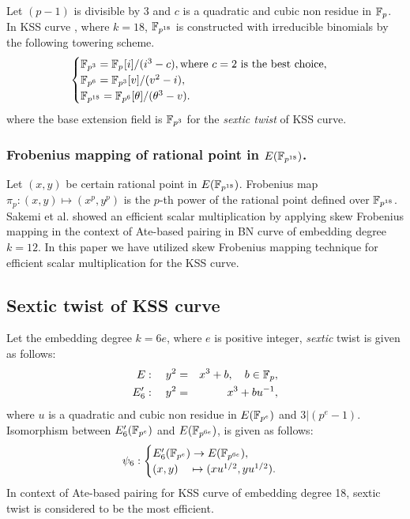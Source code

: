 Let $(p-1)$ is divisible by 3 and $c$ is a quadratic and cubic non residue in ${\mathbb{F}}_{p}$. In KSS curve \cite{kss}, where $k=18$, $\mathbb{F}_{p^{18}}$ is constructed  with irreducible binomials by the following towering scheme.
\begin{equation}
\begin{cases}
{\mathbb{F}}_{p^{3}} = {\mathbb{F}}_{p^{}}[i]/(i^3-c),  \text{where $c = 2$ is the best choice,}\nonumber \\ 
{\mathbb{F}}_{p^{6}} = {\mathbb{F}}_{p^{3}}[v]/(v^2-i), \nonumber \\ 
{\mathbb{F}}_{p^{18}} = {\mathbb{F}}_{p^{6}}[\theta]/(\theta^3-v). \nonumber \\ 
\end{cases}
\end{equation}\label{KSS_towering}
where the base extension field is $\mathbb{F}_{p^3}$ for the \textit{sextic twist} of KSS curve.

\subsubsection{Frobenius mapping of rational point in  $E(\mathbb{F}_{p^{18}})$.}
Let $(x,y)$ be certain rational point in $E(\mathbb{F}_{p^{18}})$. 
Frobenius map $\pi_p : (x,y) \mapsto  (x^p,y^p)$ is the $p$-th power of the rational point defined over $\mathbb{F}_{p^{18}}$. 
Sakemi et al. \cite{sakemi_skew} showed an efficient scalar multiplication by applying skew Frobenius mapping in the context of Ate-based pairing in BN curve of embedding degree $k=12$.  In this paper we have utilized skew Frobenius mapping technique for efficient scalar multiplication for the KSS curve.

\subsection{Sextic twist of KSS curve}
Let the embedding degree $k = 6e$, where $e$ is positive integer, \textit{sextic} twist is given as follows:
\begin{eqnarray}
E:  \quad y^2 & = & x^3+b, \quad b \in {\mathbb{F}}_{p}, \\
E'_6: \quad y^2 & =  & x^3+bu^{-1},
\end{eqnarray}  
where $u$ is a quadratic and cubic non residue in $E({\mathbb{F}}_{p^{e}})$ and $3|(p^e-1)$.  Isomorphism between $E'_6({\mathbb{F}}_{p^{e}})$ and $E({\mathbb{F}}_{p^{6e}})$, is given as follows:
\begin{eqnarray}
\psi_6 : \begin{cases}
E'_6({\mathbb{F}}_{p^{e}}) \rightarrow E({\mathbb{F}}_{p^{6e}}),\\
(x,y) \quad \mapsto (xu^{1/2},yu^{1/2}).
\end{cases}
\end{eqnarray}
In context of Ate-based pairing for KSS curve of embedding degree 18, sextic twist is considered to be the most efficient.

